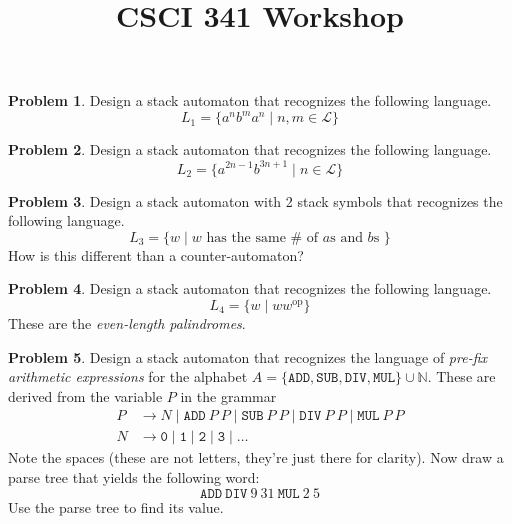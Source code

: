\documentclass[11pt]{article}
\title{CSCI 341 Workshop \wshop}
\author{\subtitle}
\theoremstyle{theorem} %
\theoremstyle{definition} %
\newtheorem{problem}                    {{\color{BurntOrange}Problem}}
\theoremstyle{remark} %
\begin{document}
\maketitle



\begin{problem}
    Design a stack automaton that recognizes the following language.
    \[
        L_1 = \{a^n b^m a^n \mid n,m \in \mathcal L\}
    \] 
\end{problem}

\vspace{20em}

\begin{problem}
    Design a stack automaton that recognizes the following language.
    \[
        L_2 = \{a^{2n - 1} b^{3n + 1} \mid n \in \mathcal L\}
    \] 
\end{problem}

\pagebreak

\begin{problem}
    Design a stack automaton with 2 stack symbols that recognizes the following language.
    \[
        L_3 = \{w \mid w \text{ has the same \(\#\) of \(a\)s and \(b\)s }\}
    \] 
    How is this different than a counter-automaton?
\end{problem}

\vspace{20em}

\begin{problem}
    Design a stack automaton that recognizes the following language.
    \[
        L_4 = \{w \mid ww^{\text{op}}\}
    \] 
    These are the \emph{even-length palindromes}.
\end{problem}

\pagebreak

\begin{problem}
    Design a stack automaton that recognizes the language of \emph{pre-fix arithmetic expressions} for the alphabet \(A = \{\mathtt{ADD}, \mathtt{SUB}, \mathtt{DIV}, \mathtt{MUL}\} \cup \mathbb{N}\).
    These are derived from the variable \(P\) in the grammar
    \[\begin{aligned}
        P &\to N \mid \mathtt{ADD}~P~P \mid \mathtt{SUB}~P~P \mid \mathtt{DIV}~P~P \mid \mathtt{MUL}~P~P \\
        N &\to \mathtt{0} \mid \mathtt{1} \mid \mathtt{2} \mid \mathtt{3} \mid \dots
    \end{aligned}\] 
    Note the spaces (these are not letters, they're just there for clarity).
    Now draw a parse tree that yields the following word: 
    \[
        \mathtt{ADD}~\mathtt{DIV}~9~31~\mathtt{MUL}~2~5
    \]
    Use the parse tree to find its value.
\end{problem}
\end{document}
